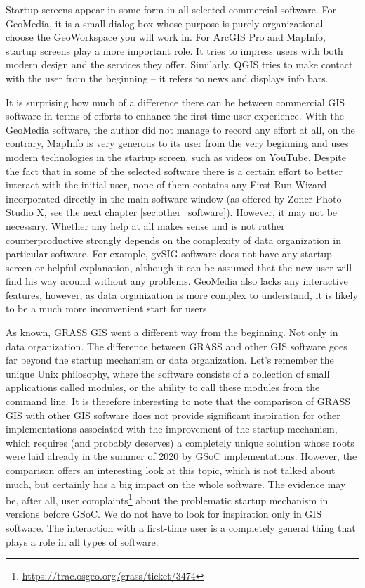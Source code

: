 \documentclass[a4paper,10pt,twoside]{article}
\begin{document}
\newpage \noindent Startup screens appear in some form in all selected commercial software. For GeoMedia, it is a small dialog box whose purpose is purely organizational -- choose the GeoWorkspace you will work in. For ArcGIS Pro and MapInfo, startup screens play a more important role. It tries to impress users with both modern design and the services they offer. Similarly, QGIS tries to make contact with the user from the beginning -- it refers to news and displays info bars.

It is surprising how much of a difference there can be between commercial GIS software in terms of efforts to enhance the first-time user experience. With the GeoMedia software, the author did not manage to record any effort at all, on the contrary, MapInfo is very generous to its user from the very beginning and uses modern technologies in the startup screen, such as videos on YouTube. Despite the fact that in some of the selected software there is a certain effort to better interact with the initial user, none of them contains any First Run Wizard incorporated directly in the main software window (as offered by Zoner Photo Studio X, see the next chapter \ref{sec:other_software}). However, it may not be necessary. Whether any help at all makes sense and is not rather counterproductive strongly depends on the complexity of data organization in particular software. For example, gvSIG software does not have any startup screen or helpful explanation, although it can be assumed that the new user will find his way around without any problems. GeoMedia also lacks any interactive features, however, as data organization is more complex to understand, it is likely to be a much more inconvenient start for users.

As known, GRASS GIS went a different way from the beginning. Not only in data organization. The difference between GRASS and other GIS software goes far beyond the startup mechanism or data organization. Let's remember the unique Unix philosophy, where the software consists of a collection of small applications called modules, or the ability to call these modules from the command line. It is therefore interesting to note that the comparison of GRASS GIS with other GIS software does not provide significant inspiration for other implementations associated with the improvement of the startup mechanism, which requires (and probably deserves) a completely unique solution whose roots were laid already in the summer of 2020 by GSoC implementations. However, the comparison offers an interesting look at this topic, which is not talked about much, but certainly has a big impact on the whole software. The evidence may be, after all, user complaints\footnote{\url{https://trac.osgeo.org/grass/ticket/3474}} about the problematic startup mechanism in versions before GSoC.
We do not have to look for inspiration only in GIS software. The interaction with a first-time user is a completely general thing that plays a role in all types of software.
\end{document}
